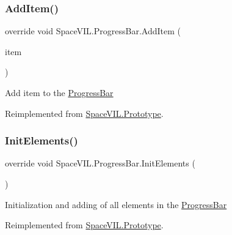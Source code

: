 \subsubsection{\texorpdfstring{Add\+Item()}{AddItem()}}
{\footnotesize\ttfamily override void Space\+V\+I\+L.\+Progress\+Bar.\+Add\+Item (\begin{DoxyParamCaption}\item[{\mbox{\hyperlink{interface_space_v_i_l_1_1_core_1_1_i_base_item}{I\+Base\+Item}}}]{item }\end{DoxyParamCaption})\hspace{0.3cm}{\ttfamily [virtual]}}



Add item to the \mbox{\hyperlink{class_space_v_i_l_1_1_progress_bar}{Progress\+Bar}} 



Reimplemented from \mbox{\hyperlink{class_space_v_i_l_1_1_prototype}{Space\+V\+I\+L.\+Prototype}}.

\mbox{\label{class_space_v_i_l_1_1_progress_bar_a61f9a8602172eebf205ed6eee8cb3e30}} 
\subsubsection{\texorpdfstring{Init\+Elements()}{InitElements()}}
{\footnotesize\ttfamily override void Space\+V\+I\+L.\+Progress\+Bar.\+Init\+Elements (\begin{DoxyParamCaption}{ }\end{DoxyParamCaption})\hspace{0.3cm}{\ttfamily [virtual]}}



Initialization and adding of all elements in the \mbox{\hyperlink{class_space_v_i_l_1_1_progress_bar}{Progress\+Bar}} 



Reimplemented from \mbox{\hyperlink{class_space_v_i_l_1_1_prototype_ac3379fe02923ee155b5b0084abf27420}{Space\+V\+I\+L.\+Prototype}}.

\mbox{\label{class_space_v_i_l_1_1_progress_bar_a97819041fe132c67cfca2b960d07a24c}} 
